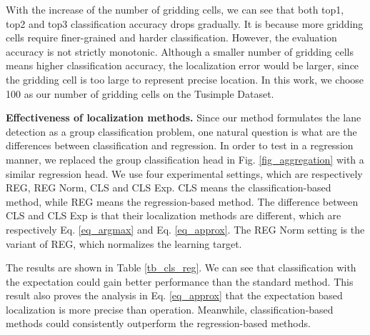 \documentclass[runningheads]{llncs}
\begin{document}
With the increase of the number of gridding cells, we can see that both top1, top2 and top3 classification accuracy drops gradually. It is because more gridding cells require finer-grained and harder classification. However, the evaluation accuracy is not strictly monotonic. Although a smaller number of gridding cells means higher classification accuracy, the localization error would be larger, since the gridding cell is too large to represent precise location. In this work, we choose 100 as our number of gridding cells on the Tusimple Dataset.



\noindent
\textbf{Effectiveness of localization methods.}
Since our method formulates the lane detection as a group classification problem, one natural question is what are the differences between classification and regression. In order to test in a regression manner, we replaced the group classification head in Fig. \ref{fig_aggregation} with a similar regression head. We use four experimental settings, which are respectively REG, REG Norm, CLS and CLS Exp. CLS means the classification-based method, while REG means the regression-based method. The difference between CLS and CLS Exp is that their localization methods are different, which are respectively Eq. \ref{eq_argmax} and Eq. \ref{eq_approx}. The REG Norm setting is the variant of REG, which normalizes the learning target.

\begin{table}[h]
	\vspace{-10pt}
	\centering
	\caption{Comparison between classification and regression on the Tusimple dataset. REG and REG Norm are regression-based methods, while the ground truth scale of REG Norm is normalized. CLS means standard classification with the localization method in Eq. \ref{eq_argmax} and CLS Exp means the one with Eq. \ref{eq_approx}. }
	\label{tb_cls_reg}
	\vspace{-10pt}
\end{table}


The results are shown in Table \ref{tb_cls_reg}. We can see that classification with the expectation could gain better performance than the standard method. This result also proves the analysis in Eq. \ref{eq_approx} that the expectation based localization is more precise than  operation. Meanwhile, classification-based methods could consistently outperform the regression-based methods. 
\end{document}
